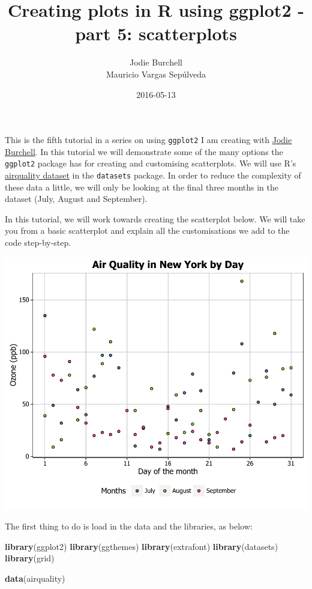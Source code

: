 \documentclass[]{article}
\title{Creating plots in R using ggplot2 - part 5: scatterplots}
\author{Jodie Burchell \\ Mauricio Vargas Sepúlveda}
\date{2016-05-13}
\newenvironment{Shaded}{\begin{snugshade}}{\end{snugshade}}
\newcommand{\KeywordTok}[1]{\textcolor[rgb]{0.13,0.29,0.53}{\textbf{{#1}}}}
\newcommand{\NormalTok}[1]{{#1}}
\begin{document}
\maketitle

{
\setcounter{tocdepth}{2}
\tableofcontents
}
This is the fifth tutorial in a series on using \texttt{ggplot2} I am
creating with \href{http://t-redactyl.github.io/}{Jodie Burchell}. In
this tutorial we will demonstrate some of the many options the
\texttt{ggplot2} package has for creating and customising scatterplots.
We will use R's
\href{https://stat.ethz.ch/R-manual/R-devel/library/datasets/html/airquality.html}{airquality
dataset} in the \texttt{datasets} package. In order to reduce the
complexity of these data a little, we will only be looking at the final
three months in the dataset (July, August and September).

In this tutorial, we will work towards creating the scatterplot below.
We will take you from a basic scatterplot and explain all the
customisations we add to the code step-by-step.

\begin{center}\includegraphics{5_Scatter_Plots_pdf/scatter_finalgraph-1} \end{center}

The first thing to do is load in the data and the libraries, as below:

\begin{Shaded}
\begin{Highlighting}[]
\KeywordTok{library}\NormalTok{(ggplot2)}
\KeywordTok{library}\NormalTok{(ggthemes)}
\KeywordTok{library}\NormalTok{(extrafont)}
\KeywordTok{library}\NormalTok{(datasets)}
\KeywordTok{library}\NormalTok{(grid)}

\KeywordTok{data}\NormalTok{(airquality)}
\end{Highlighting}
\end{Shaded}
\end{document}
